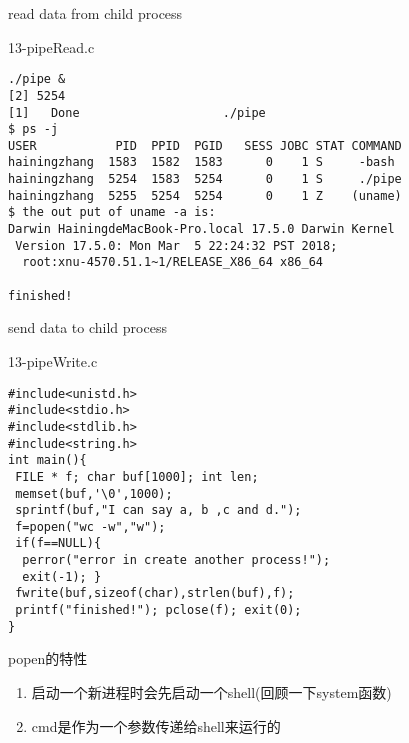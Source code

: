 \documentclass{beamer}
\begin{document}
\begin{frame}[fragile]{read data from child process}
\begin{block}{13-pipeRead.c}
\begin{verbatim}
./pipe &
[2] 5254
[1]   Done                    ./pipe
$ ps -j
USER           PID  PPID  PGID   SESS JOBC STAT COMMAND
hainingzhang  1583  1582  1583      0    1 S     -bash
hainingzhang  5254  1583  5254      0    1 S     ./pipe
hainingzhang  5255  5254  5254      0    1 Z    (uname)
$ the out put of uname -a is:
Darwin HainingdeMacBook-Pro.local 17.5.0 Darwin Kernel 
 Version 17.5.0: Mon Mar  5 22:24:32 PST 2018; 
  root:xnu-4570.51.1~1/RELEASE_X86_64 x86_64

finished!
\end{verbatim}
\end{block}
\end{frame}

\begin{frame}[fragile]{send data to child process}
\begin{block}{13-pipeWrite.c}
\begin{verbatim}
#include<unistd.h>
#include<stdio.h>
#include<stdlib.h>
#include<string.h>
int main(){
 FILE * f; char buf[1000]; int len;
 memset(buf,'\0',1000);
 sprintf(buf,"I can say a, b ,c and d.");		
 f=popen("wc -w","w");
 if(f==NULL){
  perror("error in create another process!");
  exit(-1); }
 fwrite(buf,sizeof(char),strlen(buf),f);
 printf("finished!"); pclose(f); exit(0);
}
\end{verbatim}
\end{block}
\end{frame}
\begin{frame}{popen的特性}
\begin{enumerate}
\item
启动一个新进程时会先启动一个shell(回顾一下system函数)
\item
cmd是作为一个参数传递给shell来运行的
\end{enumerate}
\end{frame}
\end{document}
